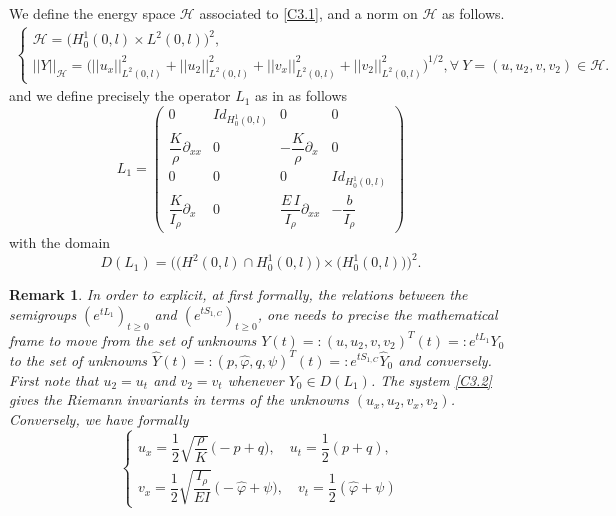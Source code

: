 \documentclass[10pt, english]{article}
\newtheorem{oss}[thm]{Remark}
\begin{document}
{We define the energy space $\mathcal{H}$ associated to \eqref{C3.1}, and a norm on $\mathcal{H}$ as follows.
\begin{multline}\label{C4.32}%
\begin{cases}
\mathcal{H}=\big(H^1_0(0,l)\times L^2(0,l)\big)^2, \\
||Y||_{\mathcal{H}}= \Big(||u_x||_{L^2(0,l)}^2 + ||u_2||_{L^2(0,l)}^2 + ||v_x||_{L^2(0,l)}^2 + ||v_2||_{L^2(0,l)}^2\Big)^{1/2},
\forall \ Y=(u,u_2,v,v_2) \in \mathcal{H}.
\end{cases}
\end{multline}
and we define precisely the operator $L_1$ as in \cite{SW2003} as follows
\begin{equation}\label{C4.33}%
L_1=\begin{pmatrix}
0 & Id_{H^1_0(0,l)} & 0 & 0 \\
\dfrac{K}{\rho} \partial_{xx} & 0 & - \dfrac{K}{\rho} \partial_{x} & 0 \\
0 & 0 & 0 & Id_{H^1_0(0,l)} \\
\dfrac{K}{I_{\rho} }\partial_{x} & 0 & \dfrac{E\,I}{I_{\rho} }\partial_{xx} & - \dfrac{b}{I_{\rho}}
\end{pmatrix}
\end{equation}
with the domain
\begin{equation}\label{C4.34}%
D(L_1)=\Big(\big(H^2(0,l)\cap H^1_0(0,l))\times \big(H^1_0(0,l)\big)\Big)^2.
\end{equation}
\begin{oss}\label{Frame}
In order to explicit, at first formally, the relations between the semigroups $(e^{tL_1})_{t\geqslant 0}$
and $(e^{tS_{1,C}})_{t\geqslant 0}$, one needs to precise the mathematical frame to move from the set of unknowns
$Y(t)=: (u,u_2,v,v_2)^T(t)=: e^{tL_1}Y_0$ to the set of unknowns $\widehat{Y}(t)=:(p,\widehat{\varphi}, q , \psi)^T(t)=: e^{tS_{1,C}}\widehat{Y}_0$ and conversely. 
First note that $u_2=u_t$ and $v_2=v_t$ whenever $Y_0 \in D(L_1)$.
The system \eqref{C3.2} gives the Riemann invariants in terms of the unknowns $(u_x,u_2,v_x,v_2)$. Conversely, we have formally
\begin{equation}\label{C4.35}%
\begin{cases}
u_x=\dfrac{1}{2}\sqrt{\dfrac{\rho}{K}}\,\Big(-p+q\Big), \quad u_t= \dfrac{1}{2}(p+q),\\
v_x=\dfrac{1}{2} \sqrt{\dfrac{I_{\rho}}{EI}}\,\Big(-\widehat{\varphi}+\psi\Big), \quad v_t=\dfrac{1}{2}(\widehat{\varphi}+\psi)
\end{cases} 

\end{equation}
\end{oss}}
\end{document}
